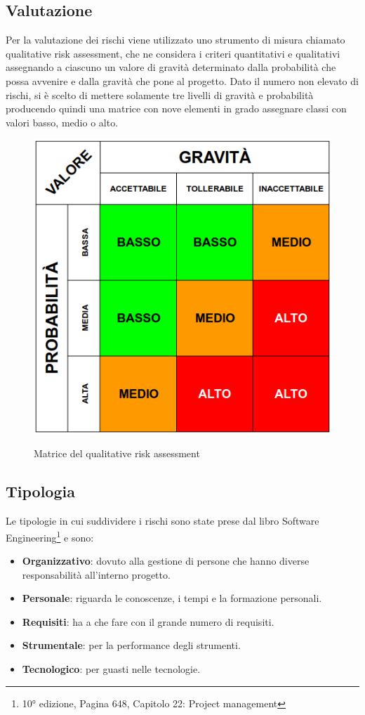	\subsection{Valutazione}
	Per la valutazione dei rischi viene utilizzato uno strumento di misura chiamato qualitative risk assessment, che ne considera i criteri quantitativi e qualitativi assegnando a ciascuno un valore di gravità determinato dalla probabilità che possa avvenire e dalla gravità che pone al progetto.
	Dato il numero non elevato di rischi, si è scelto di mettere solamente tre livelli di gravità e probabilità producendo quindi una matrice con nove elementi in grado assegnare classi con valori basso, medio o alto.
	\begin{figure}[H]
		\centering
		\includegraphics[scale=0.6]{img/risk_assessment_table.png}\\
		\caption{Matrice del qualitative risk assessment}
	\end{figure}
	\subsection{Tipologia}
	Le tipologie in cui suddividere i rischi sono state prese dal libro Software Engineering\footnote{10° edizione, Pagina 648, Capitolo 22: Project management} e sono:
	\begin{itemize}
 		\item \textbf{Organizzativo}: dovuto alla gestione di persone che hanno diverse responsabilità all'interno progetto.
		\item \textbf{Personale}: riguarda le conoscenze, i tempi e la formazione personali.
		\item \textbf{Requisiti}: ha a che fare con il grande numero di requisiti.
		\item \textbf{Strumentale}: per la performance degli strumenti.
		\item \textbf{Tecnologico}: per guasti nelle tecnologie.
	\end{itemize}
